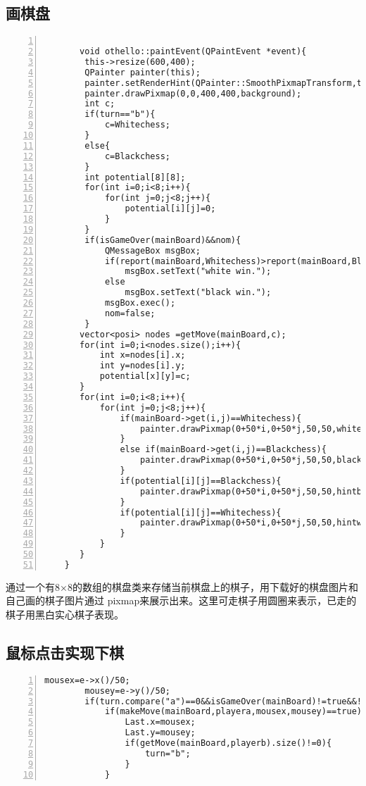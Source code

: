 \documentclass[UTF8]{ctexart}
\begin{document}
\subsection{画棋盘}
    \begin{lstlisting}[language={[ANSI]C},numbers=left,numberstyle=\tiny,%frame=shadowbox,  
       rulesepcolor=\color{red!20!green!20!blue!20},  
       keywordstyle=\color{blue!70!black},  
       commentstyle=\color{blue!90!},  
       basicstyle=\ttfamily]  
    
       void othello::paintEvent(QPaintEvent *event){
        this->resize(600,400);
        QPainter painter(this);
        painter.setRenderHint(QPainter::SmoothPixmapTransform,true);
        painter.drawPixmap(0,0,400,400,background);
        int c;
        if(turn=="b"){
            c=Whitechess;
        }
        else{
            c=Blackchess;
        }
        int potential[8][8];
        for(int i=0;i<8;i++){
            for(int j=0;j<8;j++){
                potential[i][j]=0;
            }
        }
        if(isGameOver(mainBoard)&&nom){
            QMessageBox msgBox;
            if(report(mainBoard,Whitechess)>report(mainBoard,Blackchess))
                msgBox.setText("white win.");
            else
                msgBox.setText("black win.");
            msgBox.exec();
            nom=false;
        }
       vector<posi> nodes =getMove(mainBoard,c);
       for(int i=0;i<nodes.size();i++){
           int x=nodes[i].x;
           int y=nodes[i].y;
           potential[x][y]=c;
       }
       for(int i=0;i<8;i++){
           for(int j=0;j<8;j++){
               if(mainBoard->get(i,j)==Whitechess){
                   painter.drawPixmap(0+50*i,0+50*j,50,50,white);
               }
               else if(mainBoard->get(i,j)==Blackchess){
                   painter.drawPixmap(0+50*i,0+50*j,50,50,black);
               }
               if(potential[i][j]==Blackchess){
                   painter.drawPixmap(0+50*i,0+50*j,50,50,hintblack);
               }
               if(potential[i][j]==Whitechess){
                   painter.drawPixmap(0+50*i,0+50*j,50,50,hintwhite);
               }
           }
       }
    }
    \end{lstlisting} 
通过一个有8×8的数组的棋盘类来存储当前棋盘上的棋子，用下载好的棋盘图片和自己画的棋子图片通过
pixmap来展示出来。这里可走棋子用圆圈来表示，已走的棋子用黑白实心棋子表现。
\subsection{鼠标点击实现下棋}
    \begin{lstlisting}[language={[ANSI]C},numbers=left,numberstyle=\tiny,%frame=shadowbox,  
    rulesepcolor=\color{red!20!green!20!blue!20},  
    keywordstyle=\color{blue!70!black},  
    commentstyle=\color{blue!90!},  
    basicstyle=\ttfamily]  
    mousex=e->x()/50;
        mousey=e->y()/50;
        if(turn.compare("a")==0&&isGameOver(mainBoard)!=true&&!gameOver){
            if(makeMove(mainBoard,playera,mousex,mousey)==true){
                Last.x=mousex;
                Last.y=mousey;
                if(getMove(mainBoard,playerb).size()!=0){
                    turn="b";
                }
            }
        \end{lstlisting} 
\end{document}

